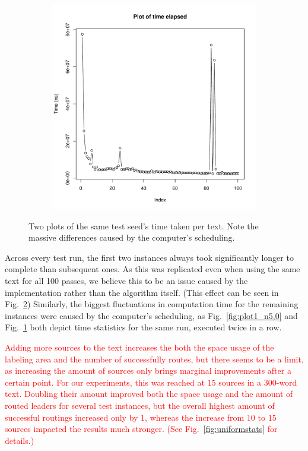 \documentclass[11pt,a4paper]{vutinfth}
\newcommand{\change}[1]{\textcolor{red}{#1}}
\begin{document}
\begin{figure}
	\begin{subfigure}[b]{\textwidth}
		\centering
		\includegraphics[page=1, scale=0.50]{Rplots_n(5-0)_repeat.pdf}
		\caption{\label{fig:plot2_n5,0}}
	\end{subfigure}
	\caption{Two plots of the same test seed's time taken per text. Note the massive differences caused by the computer's scheduling.}
	\label{fig:timeplot}
\end{figure}

Across every test run, the first two instances always took significantly longer to complete than subsequent ones. As this was replicated even when using the same text for all 100 passes, we believe this to be an issue caused by the implementation rather than the algorithm itself. (This effect can be seen in Fig.~\ref*{fig:timeplot})
Similarly, the biggest fluctuations in computation time for the remaining instances were caused by the computer's scheduling, as Fig.~\ref*{fig:plot1_n5,0} and Fig.~\ref*{fig:plot2_n5,0} both depict time statistics for the same run, executed twice in a row.

\change{Adding more sources to the text increases the both the space usage of the labeling area and the number of successfully routes, but there seems to be a limit, as increasing the amount of sources only brings marginal improvements after a certain point. For our experiments, this was reached at 15 sources in a 300-word text. Doubling their amount improved both the space usage and the amount of routed leaders for several test instances, but the overall highest amount of successful routings increased only by 1, whereas the increase from 10 to 15 sources impacted the results much stronger. (See Fig.~\ref*{fig:uniformstats} for details.)}
\end{document}
